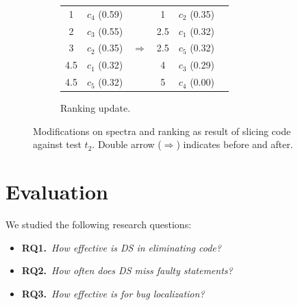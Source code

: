 \documentclass{article}
\begin{document}
\begin{figure}[tb]
  \vspace{2ex}

  \begin{subfigure}{0.5\textwidth}
    \centering
    \begin{tabular}{cccccc}
      {\cellcolor{Gray}1} & {\cellcolor{Gray}$c_4$ (0.59)} & & 1 & $c_2$ (0.35) \\
      {\cellcolor{Gray}2} & {\cellcolor{Gray}$c_3$ (0.55)} & & 2.5 & $c_1$ (0.32)\\
      3 & $c_2$ (0.35) & \hspace{1ex}$\Rightarrow$\hspace{1ex} & 2.5 & $c_5$ (0.32)\\
      4.5 & $c_1$ (0.32) & & {\cellcolor{Gray}4} & {\cellcolor{Gray}$c_3$ (0.29)}\\
      4.5 & $c_5$ (0.32) & & {\cellcolor{Gray}5} & {\cellcolor{Gray}$c_4$ (0.00)}\\
    \end{tabular}
    \caption{Ranking update.}
  \end{subfigure}

  \caption{Modifications on spectra and ranking as result of slicing
    code against test $t_2$. Double arrow ($\Rightarrow$) indicates
    before and after.}
  \label{fig:illustration}
  \vspace{-2ex}
\end{figure}

%
\section{Evaluation}
\label{sec:eval}

We studied the following research questions:


\newcommand{\rqone}{How effective is DS in eliminating code?}
\newcommand{\rqtwo}{How often does DS miss faulty statements?}
\newcommand{\rqthree}{How effective is \comb{} for bug localization?}

\begin{itemize}[leftmargin=0em]
\item[]{\textbf{RQ1.}}~\textit{\rqone{}}
\item[]{\textbf{RQ2.}}~\textit{\rqtwo{}}
\item[]{\textbf{RQ3.}}~\textit{\rqthree{}}
\end{itemize}
\end{document}
